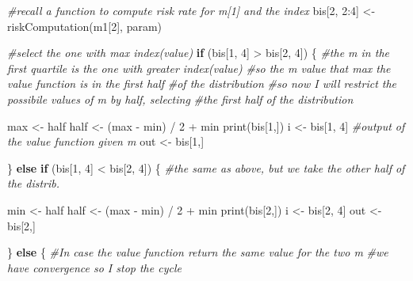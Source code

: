 \documentclass[
]{article}
\newenvironment{Shaded}{\begin{snugshade}}{\end{snugshade}}
\newcommand{\CommentTok}[1]{\textcolor[rgb]{0.56,0.35,0.01}{\textit{#1}}}
\newcommand{\ControlFlowTok}[1]{\textcolor[rgb]{0.13,0.29,0.53}{\textbf{#1}}}
\newcommand{\DecValTok}[1]{\textcolor[rgb]{0.00,0.00,0.81}{#1}}
\newcommand{\FunctionTok}[1]{\textcolor[rgb]{0.00,0.00,0.00}{#1}}
\newcommand{\NormalTok}[1]{#1}
\newcommand{\OtherTok}[1]{\textcolor[rgb]{0.56,0.35,0.01}{#1}}
\newcommand{\SpecialCharTok}[1]{\textcolor[rgb]{0.00,0.00,0.00}{#1}}
\begin{document}
\begin{Shaded}
\begin{Highlighting}[]
      \CommentTok{\#recall a function to compute risk rate for m[1] and the index}
\NormalTok{      bis[}\DecValTok{2}\NormalTok{, }\DecValTok{2}\SpecialCharTok{:}\DecValTok{4}\NormalTok{] }\OtherTok{\textless{}{-}} \FunctionTok{riskComputation}\NormalTok{(m1[}\DecValTok{2}\NormalTok{], param)}
      
      \CommentTok{\#select the one with max index(value)}
      \ControlFlowTok{if}\NormalTok{ (bis[}\DecValTok{1}\NormalTok{, }\DecValTok{4}\NormalTok{] }\SpecialCharTok{\textgreater{}}\NormalTok{ bis[}\DecValTok{2}\NormalTok{, }\DecValTok{4}\NormalTok{]) \{}
        \CommentTok{\#the m in the first quartile is the one with greater index(value)}
        \CommentTok{\#so the m value that max the value function is in the first half}
        \CommentTok{\#of the distribution}
        \CommentTok{\#so now I will restrict the possibile values of m by half, selecting}
        \CommentTok{\#the first half of the distribution}

\NormalTok{        max     }\OtherTok{\textless{}{-}}\NormalTok{ half}
\NormalTok{        half    }\OtherTok{\textless{}{-}}\NormalTok{ (max }\SpecialCharTok{{-}}\NormalTok{ min) }\SpecialCharTok{/} \DecValTok{2} \SpecialCharTok{+}\NormalTok{ min}
        \FunctionTok{print}\NormalTok{(bis[}\DecValTok{1}\NormalTok{,])}
\NormalTok{        i       }\OtherTok{\textless{}{-}}\NormalTok{ bis[}\DecValTok{1}\NormalTok{, }\DecValTok{4}\NormalTok{]  }\CommentTok{\#output of the value function given m}
\NormalTok{        out }\OtherTok{\textless{}{-}}\NormalTok{ bis[}\DecValTok{1}\NormalTok{,]}

\NormalTok{      \} }\ControlFlowTok{else} \ControlFlowTok{if}\NormalTok{ (bis[}\DecValTok{1}\NormalTok{, }\DecValTok{4}\NormalTok{] }\SpecialCharTok{\textless{}}\NormalTok{ bis[}\DecValTok{2}\NormalTok{, }\DecValTok{4}\NormalTok{]) \{}
        \CommentTok{\#the same as above, but we take the other half of the distrib.}

\NormalTok{        min     }\OtherTok{\textless{}{-}}\NormalTok{ half}
\NormalTok{        half    }\OtherTok{\textless{}{-}}\NormalTok{ (max }\SpecialCharTok{{-}}\NormalTok{ min) }\SpecialCharTok{/} \DecValTok{2} \SpecialCharTok{+}\NormalTok{ min}
        \FunctionTok{print}\NormalTok{(bis[}\DecValTok{2}\NormalTok{,])}
\NormalTok{        i       }\OtherTok{\textless{}{-}}\NormalTok{ bis[}\DecValTok{2}\NormalTok{, }\DecValTok{4}\NormalTok{]}
\NormalTok{        out }\OtherTok{\textless{}{-}}\NormalTok{  bis[}\DecValTok{2}\NormalTok{,]}

\NormalTok{      \} }\ControlFlowTok{else}\NormalTok{ \{}
        \CommentTok{\#In case the value function return the same value for the two m}
        \CommentTok{\#we have convergence so I stop the cycle}


\end{Highlighting}
\end{Shaded}
\end{document}
